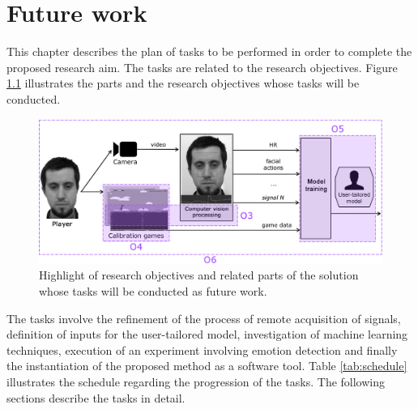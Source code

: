 \chapter{Future work}
\label{ch:closing}

This chapter describes the plan of tasks to be performed in order to complete the proposed research aim. The tasks are related to the research objectives. Figure \ref{fig:future-work-objectives} illustrates the parts and the research objectives whose tasks will be conducted.

\begin{figure}[h]
    \centering
    \includegraphics[width=\textwidth]{figures/future-work-objectives.png}
    \caption{Highlight of research objectives and related parts of the solution whose tasks will be conducted as future work.}
    \label{fig:future-work-objectives}
\end{figure}

The tasks involve the refinement of the process of remote acquisition of signals, definition of inputs for the user-tailored model, investigation of machine learning techniques, execution of an experiment involving emotion detection and finally the instantiation of the proposed method as a software tool. Table \ref{tab:schedule} illustrates the schedule regarding the progression of the tasks. The following sections describe the tasks in detail.

